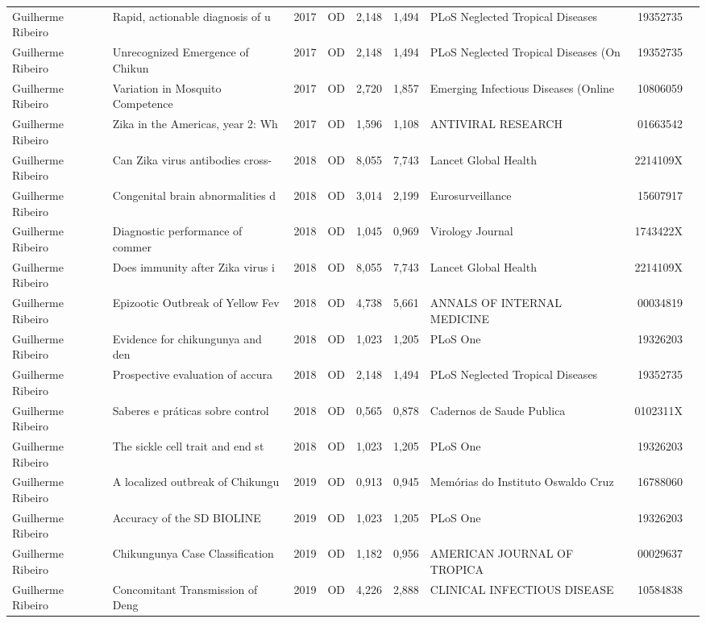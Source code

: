 \documentclass[12pt,brazil]{article}\usepackage[]{graphicx}\usepackage[]{xcolor}
\begin{document}
\begin{longtable}{lllrrllrr}
Guilherme Ribeiro & Rapid, actionable diagnosis of u & 2017 & OD & 2,148 & 1,494 & PLoS Neglected Tropical Diseases & 19352735 \\
Guilherme Ribeiro & Unrecognized Emergence of Chikun & 2017 & OD & 2,148 & 1,494 & PLoS Neglected Tropical Diseases (On & 19352735 \\
Guilherme Ribeiro & Variation in Mosquito Competence & 2017 & OD & 2,720 & 1,857 & Emerging Infectious Diseases (Online & 10806059 \\
Guilherme Ribeiro & Zika in the Americas, year 2: Wh & 2017 & OD & 1,596 & 1,108 & ANTIVIRAL RESEARCH & 01663542 \\
Guilherme Ribeiro & Can Zika virus antibodies cross- & 2018 & OD & 8,055 & 7,743 & Lancet Global Health & 2214109X \\
Guilherme Ribeiro & Congenital brain abnormalities d & 2018 & OD & 3,014 & 2,199 & Eurosurveillance & 15607917 \\
Guilherme Ribeiro & Diagnostic performance of commer & 2018 & OD & 1,045 & 0,969 & Virology Journal & 1743422X \\
Guilherme Ribeiro & Does immunity after Zika virus i & 2018 & OD & 8,055 & 7,743 & Lancet Global Health & 2214109X \\
Guilherme Ribeiro & Epizootic Outbreak of Yellow Fev & 2018 & OD & 4,738 & 5,661 & ANNALS OF INTERNAL MEDICINE & 00034819 \\
Guilherme Ribeiro & Evidence for chikungunya and den & 2018 & OD & 1,023 & 1,205 & PLoS One & 19326203 \\
Guilherme Ribeiro & Prospective evaluation of accura & 2018 & OD & 2,148 & 1,494 & PLoS Neglected Tropical Diseases & 19352735 \\
Guilherme Ribeiro & Saberes e práticas sobre control & 2018 & OD & 0,565 & 0,878 & Cadernos de Saude Publica & 0102311X \\
Guilherme Ribeiro & The sickle cell trait and end st & 2018 & OD & 1,023 & 1,205 & PLoS One & 19326203 \\
Guilherme Ribeiro & A localized outbreak of Chikungu & 2019 & OD & 0,913 & 0,945 & Memórias do Instituto Oswaldo Cruz & 16788060 \\
Guilherme Ribeiro & Accuracy of the SD BIOLINE  & 2019 & OD & 1,023 & 1,205 & PLoS One & 19326203 \\
Guilherme Ribeiro & Chikungunya Case Classification  & 2019 & OD & 1,182 & 0,956 & AMERICAN JOURNAL OF TROPICA & 00029637 \\
Guilherme Ribeiro & Concomitant Transmission of Deng & 2019 & OD & 4,226 & 2,888 & CLINICAL INFECTIOUS DISEASE & 10584838 \\

\end{longtable}
\end{document}
